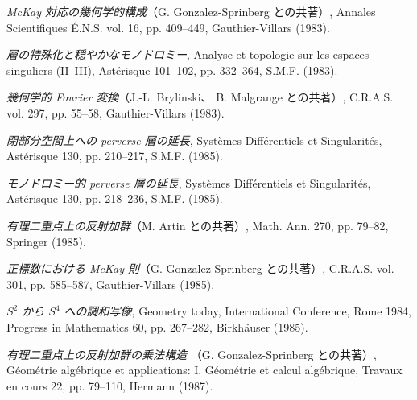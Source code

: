 \clearpage
{}
\small
\begin{description}
\item[{[37]}] \emph{McKay 対応の幾何学的構成}（G. Gonzalez-Sprinberg
との共著）, Annales Scientifiques É.N.S. vol. 16, pp. 409--449,
Gauthier-Villars (1983).

\item[{[38]}] \emph{層の特殊化と穏やかなモノドロミー}, Analyse et
topologie sur les espaces singuliers (II--III), Astérisque 101--102,
pp. 332--364, S.M.F. (1983).

\item[{[39]}] \emph{幾何学的 Fourier 変換}（J.-L. Brylinski、
B. Malgrange との共著）, C.R.A.S. vol. 297, pp. 55--58,
Gauthier-Villars (1983).

\item[{[40]}] \emph{閉部分空間上への perverse 層の延長}, Systèmes
Différentiels et Singularités, Astérisque 130, pp. 210--217, S.M.F. (1985).

\item[{[41]}] \emph{モノドロミー的 perverse 層の延長}, Systèmes
Différentiels et Singularités, Astérisque 130, pp. 218--236, S.M.F. (1985).

\item[{[42]}] \emph{有理二重点上の反射加群}（M. Artin との共著）,
Math. Ann. 270, pp. 79--82, Springer (1985).

\item[{[43]}] \emph{正標数における McKay 則}（G. Gonzalez-Sprinberg
との共著）, C.R.A.S. vol. 301, pp. 585--587, Gauthier-Villars (1985).

\item[{[44]}] \emph{$S^2$ から $S^4$ への調和写像}, Geometry today,
International Conference, Rome 1984, Progress in Mathematics 60,
pp. 267--282, Birkhäuser (1985).

\item[{[45]}] \emph{有理二重点上の反射加群の乗法構造}
（G. Gonzalez-Sprinberg との共著）, Géométrie algébrique et applications:
I. Géométrie et calcul algébrique, Travaux en cours 22, pp. 79--110,
Hermann (1987).


\end{description}
